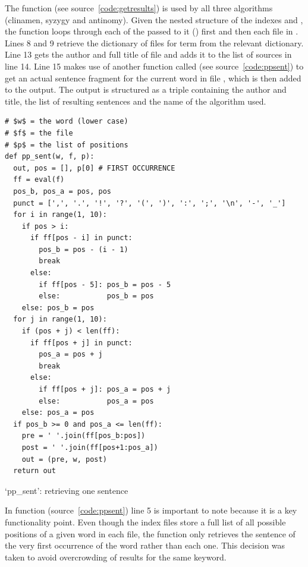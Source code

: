 The  function (see source~\ref{code:getresults}) is used by all three algorithms (clinamen, syzygy and antinomy). Given the nested structure of the indexes  and , the function loops through each of the  passed to it () first and then each file in . Lines 8 and 9 retrieve the dictionary of files for term  from the relevant dictionary. Line 13 gets the author and full title of file  and adds it to the list of sources in line 14. Line 15 makes use of another function called  (see source~\ref{code:ppsent}) to get an actual sentence fragment for the current word  in file , which is then added to the output. The output is structured as a triple containing the author and title, the list of resulting sentences and the name of the algorithm used.

\begin{listing}[!htbp] %
  \begin{verbatim}
# $w$ = the word (lower case)
# $f$ = the file
# $p$ = the list of positions
def pp_sent(w, f, p):
  out, pos = [], p[0] # FIRST OCCURRENCE
  ff = eval(f)
  pos_b, pos_a = pos, pos
  punct = [',', '.', '!', '?', '(', ')', ':', ';', '\n', '-', '_']
  for i in range(1, 10):
    if pos > i:
      if ff[pos - i] in punct:
        pos_b = pos - (i - 1)
        break
      else:
        if ff[pos - 5]: pos_b = pos - 5
        else:           pos_b = pos
    else: pos_b = pos
  for j in range(1, 10):
    if (pos + j) < len(ff):
      if ff[pos + j] in punct:
        pos_a = pos + j
        break
      else:
        if ff[pos + j]: pos_a = pos + j
        else:           pos_a = pos
    else: pos_a = pos
  if pos_b >= 0 and pos_a <= len(ff):
    pre = ' '.join(ff[pos_b:pos])
    post = ' '.join(ff[pos+1:pos_a])
    out = (pre, w, post)
  return out
  \end{verbatim}
\caption[`pp\_sent' function]{`pp\_sent': retrieving one sentence}
\label{code:ppsent}
\end{listing}

In function  (source~\ref{code:ppsent}) line 5 is important to note because it is a key functionality point. Even though the index files store a full list of all possible positions of a given word in each file, the  function only retrieves the sentence of the very first occurrence of the word rather than each one. This decision was taken to avoid overcrowding of results for the same keyword.

